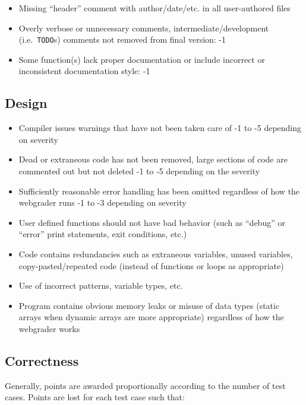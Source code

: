 \documentclass[12pt]{scrartcl}
\begin{document}
\begin{itemize}
  \item Missing ``header'' comment with author/date/etc. in all user-authored files
  \item Overly verbose or unnecessary comments, intermediate/development (i.e.\ \texttt{TODO}s) comments not removed from final version: -1
  \item Some function(s) lack proper documentation or include incorrect or inconsistent documentation style: -1
\end{itemize}

\subsection*{Design}

\begin{itemize}
  \item Compiler issues warnings that have not been taken care of -1 to -5 depending on severity
  \item Dead or extraneous code has not been removed, large sections of code are commented out but not deleted -1 to -5 depending on the severity
  \item Sufficiently reasonable error handling has been omitted regardless of how the webgrader runs -1 to -3 depending on severity
  \item User defined functions should not have bad behavior (such as ``debug'' or ``error'' print statements, exit conditions, etc.)
  \item Code contains redundancies such as extraneous variables, unused variables, copy-pasted/repeated code (instead of functions or loops as appropriate)
  \item Use of incorrect patterns, variable types, etc.
  \item Program contains obvious memory leaks or misuse of data types (static arrays when dynamic arrays are more appropriate) regardless of how the webgrader works
\end{itemize}

\subsection*{Correctness}

Generally, points are awarded proportionally according to the number of test cases.
Points are lost for each test case such that:
\end{document}
